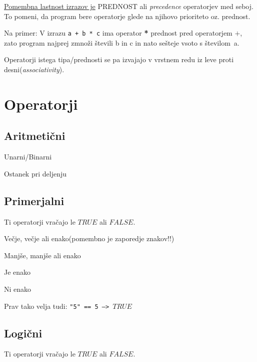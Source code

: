 \underline{Pomembna lastnost izrazov je} PREDNOST ali \textit{precedence} operatorjev med seboj. To pomeni, da program bere operatorje glede na njihovo prioriteto  oz. prednost.\

Na primer: V izrazu \texttt{a + b * c} ima operator \textbf{*} prednost pred operatorjem $+$, zato program najprej zmnoži števili b in c in nato sešteje vsoto s številom~a.\

Operatorji istega tipa/prednosti se pa izvajajo v vrstnem redu iz leve proti desni(\textit{associativity}).

\section{Operatorji}

\subsection{Aritmetični}

\begin{description}[align=left,labelwidth=3cm]
	\item[$+, -$] Unarni/Binarni
	\item[$\times, \div$]
	\item[$\%$] Ostanek pri deljenju
\end{description}

\subsection{Primerjalni}
Ti operatorji vračajo le $TRUE$ ali $FALSE$.\

\begin{description}[align=left,labelwidth=3cm]
	\item [$>, >=$]	Večje, večje ali enako(pomembno je zaporedje znakov!!)
	\item [$<, <=$]	Manjše, manjše ali enako
	\item [$==$] Je enako	
	\item [$!=$] Ni enako
\end{description} 

Prav tako velja tudi: \texttt{"5"~==~5 --> $TRUE$}

\subsection{Logični}

Ti operatorji vračajo le $TRUE$ ali $FALSE$.\


